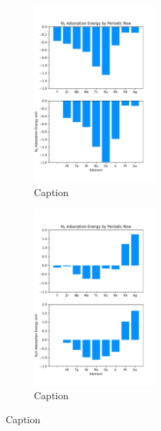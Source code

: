 \documentclass[catalysts,article,submit,moreauthors,pdftex,10pt,a4paper]{mdpi}
\theoremstyle{mdpi}
\newcounter{ex}
\newcounter{re}
\theoremstyle{mdpidefinition}
\begin{document}
\begin{figure}

\begin{subfigure}
    
    \centering
    \includegraphics[width=0.5\textwidth]{Images/N2_adsorption_rows.pdf}
    \caption{Caption}
    \label{fig:N2_rows}
\end{subfigure}

\begin{subfigure}
    \centering
    \includegraphics[width=0.5\textwidth]{Images/N2H_adsorption_rows.pdf}
    \caption{Caption}
    \label{fig:N2H_rows}
\end{subfigure}
\end{figure}
\end{document}
